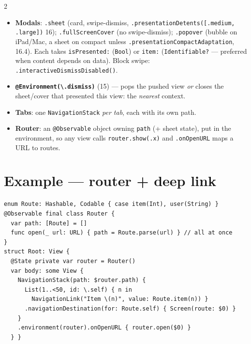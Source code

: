 \documentclass[8pt]{extarticle}
\begin{document}
\begin{multicols}{2}
\begin{itemize}
        on compact width it \textbf{collapses into a stack} (\texttt{preferredCompactColumn}, 17).
  \item \textbf{Modals}: \texttt{.sheet} (card, swipe-dismiss, \texttt{.presentationDetents([.medium,
        .large])} 16); \texttt{.fullScreenCover} (no swipe-dismiss); \texttt{.popover} (bubble on iPad/Mac,
        a sheet on compact unless \texttt{.presentationCompactAdaptation}, 16.4). Each takes
        \texttt{isPresented:} (\texttt{Bool}) or \texttt{item:} (\texttt{Identifiable?} — preferred when
        content depends on data). Block swipe: \texttt{.interactiveDismissDisabled()}.
  \item \textbf{\texttt{@Environment(\textbackslash.dismiss)}} (15) — pops the pushed view \emph{or} closes the
        sheet/cover that presented this view: the \emph{nearest} context.
  \item \textbf{Tabs}: one \texttt{NavigationStack} \emph{per tab}, each with its own path.
  \item \textbf{Router}: an \texttt{@Observable} object owning \texttt{path} (+ sheet state), put in the
        environment, so any view calls \texttt{router.show(.x)} and \texttt{.onOpenURL} maps a URL to routes.
\end{itemize}

\section{Example — router + deep link}
\begin{lstlisting}[language=SwiftSheet]
enum Route: Hashable, Codable { case item(Int), user(String) }
@Observable final class Router {
  var path: [Route] = []
  func open(_ url: URL) { path = Route.parse(url) } // all at once
}
struct Root: View {
  @State private var router = Router()
  var body: some View {
    NavigationStack(path: $router.path) {
      List(1..<50, id: \.self) { n in
        NavigationLink("Item \(n)", value: Route.item(n)) }
      .navigationDestination(for: Route.self) { Screen(route: $0) }
    }
    .environment(router).onOpenURL { router.open($0) }
  } }
\end{lstlisting}

\columnbreak


\end{multicols}
\end{document}

